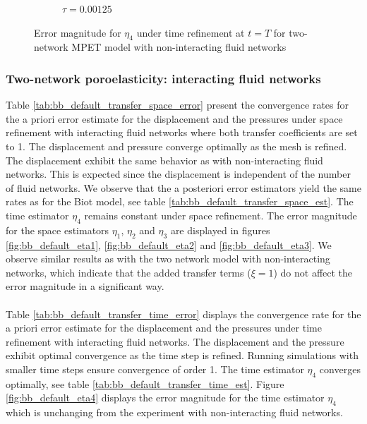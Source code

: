 \begin{figure}[h!]
\begin{subfigure}[b]{0.24\textwidth}
    \caption{$\tau=0.00125$}
  \end{subfigure}
  \caption{Error magnitude for $\eta_4$ under time refinement at $t=T$ for two-network MPET model with non-interacting fluid networks} \label{fig:bb_no_transfer_eta4}
\end{figure}
\clearpage
\subsubsection{Two-network poroelasticity: interacting fluid networks} \label{section:num_mpet2_default}
Table \ref{tab:bb_default_transfer_space_error} present the convergence rates for the a priori error estimate for the displacement and the pressures under space refinement with interacting fluid networks where both transfer coefficients are set to 1. The displacement and pressure converge optimally as the mesh is refined. The displacement exhibit the same behavior as with non-interacting fluid networks. This is expected since the displacement is independent of the number of fluid networks. We observe that the a posteriori error estimators yield the same rates as for the Biot model, see table \ref{tab:bb_default_transfer_space_est}. The time estimator $\eta_4$ remains constant under space refinement. The error magnitude for the space estimators $\eta_1$, $\eta_2$ and $\eta_3$ are displayed in figures \ref{fig:bb_default_eta1}, \ref{fig:bb_default_eta2} and \ref{fig:bb_default_eta3}. We observe similar results as with the two network model with non-interacting networks, which indicate that the added transfer terms ($\xi = 1$) do not affect the error magnitude in a significant way.
\\
\\
Table \ref{tab:bb_default_transfer_time_error} displays the convergence rate for the a priori error estimate for the displacement and the pressures under time refinement with interacting fluid networks.  The displacement and the pressure exhibit optimal convergence as the time step is refined. Running simulations with smaller time steps ensure convergence of order 1. The time estimator $\eta_4$ converges optimally, see table \ref{tab:bb_default_transfer_time_est}. Figure \ref{fig:bb_default_eta4} displays the error magnitude for the time estimator $\eta_4$ which is unchanging from the experiment with non-interacting fluid networks. 
\\
\\
